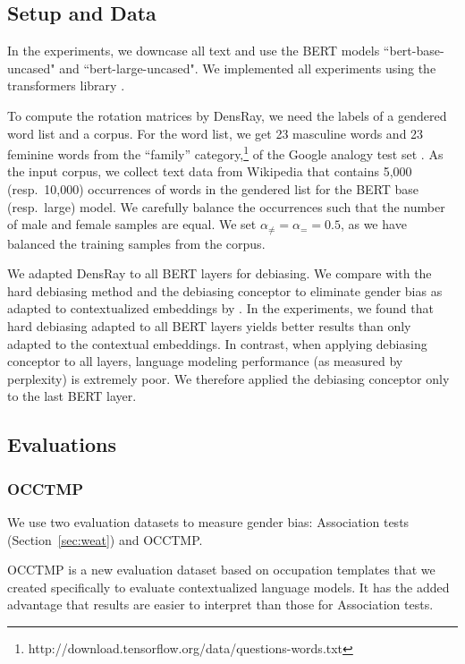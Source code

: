 \subsection{Setup and Data}
In the experiments, we downcase all text and use the BERT models ``bert-base-uncased" and ``bert-large-uncased". We implemented all experiments using the transformers library \cite{wolf2019huggingfaces}.

To compute the rotation matrices by DensRay, we need the
labels of a gendered word list and a corpus. For the word
list, we get 23 masculine words and 23 feminine words from
the ``family''
category,\footnote{http://download.tensorflow.org/data/questions-words.txt}
of the Google analogy test set \cite{mikolov2013efficient}. As the input corpus, we collect text data from Wikipedia that contains 5,000 (resp.\ 10,000)
occurrences of words in the gendered list for the BERT base
(resp.\ large) model. We carefully balance the occurrences such that the number of male and female samples are equal. We set  $\alpha_{\neq}=\alpha_{=}=0.5$, as we have balanced the training samples from the corpus.

We adapted DensRay to all BERT layers for debiasing. We
compare with the hard debiasing method \cite{mu2018all} and
the debiasing conceptor \cite{karve2019conceptor} to
eliminate gender bias as adapted to contextualized
embeddings by \cite{karve2019conceptor}. In the experiments, we found that hard debiasing adapted to all BERT layers
yields better results than only adapted to the contextual
embeddings. In contrast, when applying debiasing conceptor
to all layers, language modeling performance (as measured by
perplexity) is extremely poor.
We therefore applied the
debiasing conceptor only to the last BERT layer.

\subsection{Evaluations}
\subsubsection{OCCTMP}
We use two evaluation datasets to measure gender bias: Association tests (Section~\ref{sec:weat}) and OCCTMP.

OCCTMP is a new evaluation dataset based on occupation templates
that we created specifically to evaluate contextualized language models.  It has the added advantage that results are easier to interpret than those for Association tests.

